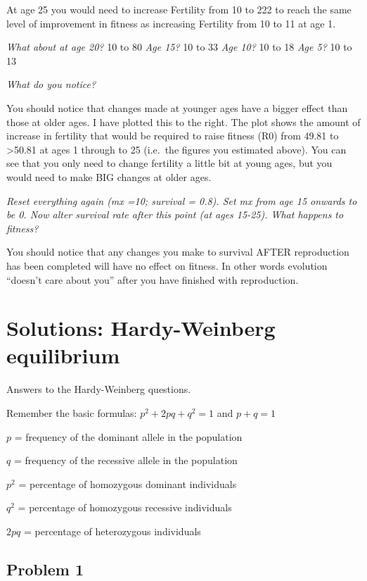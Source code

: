 \documentclass[
  a4paper]{book}
\begin{document}
At age 25 you would need to increase Fertility from 10 to 222 to reach the same level of improvement in fitness as increasing Fertility from 10 to 11 at age 1.

\emph{What about at age 20?} 10 to 80
\emph{Age 15?} 10 to 33
\emph{Age 10?} 10 to 18
\emph{Age 5?} 10 to 13

\emph{What do you notice?}

You should notice that changes made at younger ages have a bigger effect than those at older ages. I have plotted this to the right. The plot shows the amount of increase in fertility that would be required to raise fitness (R0) from 49.81 to \textgreater50.81 at ages 1 through to 25 (i.e.~the figures you estimated above). You can see that you only need to change fertility a little bit at young ages, but you would need to make BIG changes at older ages.

\emph{Reset everything again (mx =10; survival = 0.8). Set mx from age 15 onwards to be 0. Now alter survival rate after this point (at ages 15-25). What happens to fitness?}

You should notice that any changes you make to survival AFTER reproduction has been completed will have no effect on fitness. In other words evolution ``doesn't care about you'' after you have finished with reproduction.

\section{Solutions: Hardy-Weinberg equilibrium}\label{solutions-hardy-weinberg-equilibrium}

Answers to the Hardy-Weinberg questions.

Remember the basic formulas:
\(p^2 + 2pq + q^2 = 1\) and \(p + q = 1\)

\(p\) = frequency of the dominant allele in the population

\(q\) = frequency of the recessive allele in the population

\(p^2\) = percentage of homozygous dominant individuals

\(q^2\) = percentage of homozygous recessive individuals

\(2pq\) = percentage of heterozygous individuals

\subsection{Problem 1}\label{problem-1}
\end{document}

